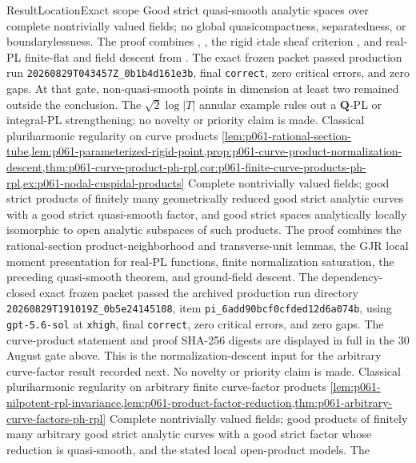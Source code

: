 \begin{AppLProvenanceLedger}{Result}{Location}{Exact scope}
  {Good strict quasi-smooth analytic spaces over complete nontrivially valued
   fields; no global quasicompactness, separatedness, or boundarylessness.
   The proof combines \cite[Proposition~7.8]{GR25Classical},
   \cite[Corollary~3.3.2]{Temkin17}, the rigid \(\acute{e}\)tale sheaf
   criterion \cite[Proposition~3.2.2]{dJvdP96}, and real-PL finite-flat and
   field descent from \cite{GJR26}.  The exact frozen packet passed production
   run \nolinkurl{20260829T043457Z_0b1b4d161e3b}, final \texttt{correct},
   zero critical errors, and zero gaps.  At that gate, non-quasi-smooth points
   in dimension at least two remained outside the conclusion.  The
   \(\sqrt{2}\log|T|\) annular example rules out a \(\mathbf Q\)-PL or
   integral-PL strengthening; no novelty or priority claim is made.}
\AppLProvenanceRecord
  {Classical pluriharmonic regularity on curve products}
  {\cref{lem:p061-rational-section-tube,lem:p061-parameterized-rigid-point,prop:p061-curve-product-normalization-descent,thm:p061-curve-product-ph-rpl,cor:p061-finite-curve-products-ph-rpl,ex:p061-nodal-cuspidal-products}}
  {Complete nontrivially valued fields; good strict products of finitely many
   geometrically reduced good strict analytic curves with a good strict
   quasi-smooth factor, and good strict spaces analytically locally isomorphic
   to open analytic subspaces of such products.  The proof combines the
   rational-section product-neighborhood and transverse-unit lemmas, the GJR
   local moment presentation for real-PL functions, finite normalization
   saturation, the preceding quasi-smooth theorem, and ground-field descent.
   The dependency-closed exact frozen packet passed the archived production
   run directory \nolinkurl{20260829T191019Z_0b5e24145108}, item
   \nolinkurl{pi_6add90bcf0cfded12d6a074b}, using \texttt{gpt-5.6-sol} at
   \texttt{xhigh}, final \texttt{correct}, zero critical errors, and zero
   gaps.  The curve-product statement and proof SHA-256 digests are displayed
   in full in the 30 August gate above.  This is the normalization-descent
   input for the arbitrary curve-factor result recorded next.  No novelty or
   priority claim is made.}
\AppLProvenanceRecord
  {Classical pluriharmonic regularity on arbitrary finite curve-factor products}
  {\cref{lem:p061-nilpotent-rpl-invariance,lem:p061-product-factor-reduction,thm:p061-arbitrary-curve-factors-ph-rpl}}
  {Complete nontrivially valued fields; good products of finitely many
   arbitrary good strict analytic curves with a good strict factor whose
   reduction is quasi-smooth, and the stated local open-product models.  The
}
\end{AppLProvenanceLedger}
